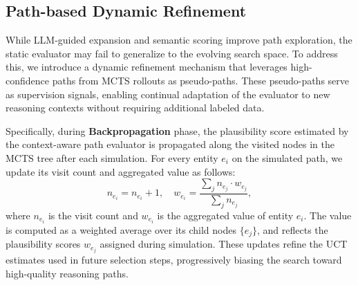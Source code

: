 



\subsection{Path-based Dynamic Refinement}

While LLM-guided expansion and semantic scoring improve path exploration, the static evaluator may fail to generalize to the evolving search space. To address this, we introduce a dynamic refinement mechanism that leverages high-confidence paths from MCTS rollouts as pseudo-paths. 
These pseudo-paths serve as supervision signals, enabling continual adaptation of the evaluator to new reasoning contexts without requiring additional labeled data.

Specifically, during \textbf{Backpropagation} phase, the plausibility score estimated by the context-aware path evaluator is propagated along the visited nodes in the MCTS tree after each simulation. For every entity $e_i$ on the simulated path, we update its visit count and aggregated value as follows:
\begin{equation}
    n_{e_i}= n_{e_i} + 1, \quad w_{e_i}= \frac{\sum_j n_{e_j}\cdot w_{e_j}}{\sum_j n_{e_j}},
\end{equation}
where $n_{e_i}$ is the visit count and $w_{e_i}$ is the aggregated value of entity $e_i$. The value is computed as a weighted average over its child nodes $\{e_j\}$, and reflects the plausibility scores $w_{e_j}$ assigned during simulation. These updates refine the UCT estimates used in future selection steps, progressively biasing the search toward high-quality reasoning paths.

